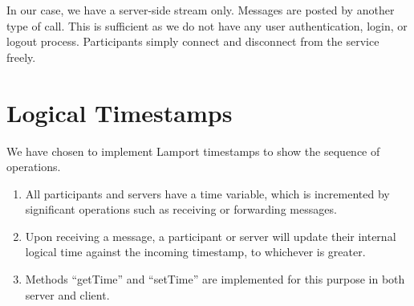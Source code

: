 \documentclass[a4paper,11pt]{article}
\begin{document}
In our case, we have a server-side stream only. Messages are posted by another type of call. This is sufficient as we do not have any user authentication, login, or logout process. Participants simply connect and disconnect from the service freely. 

\section{Logical Timestamps}
We have chosen to implement Lamport timestamps to show the sequence of operations. 

\begin{enumerate}
    \item All participants and servers have a time variable, which is incremented by significant operations such as receiving or forwarding messages. 
    \item Upon receiving a message, a participant or server will update their internal logical time against the incoming timestamp, to whichever is greater. 
    \item Methods ``getTime'' and ``setTime'' are implemented for this purpose in both server and client. 
\end{enumerate}
\end{document}
